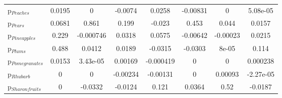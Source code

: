 \documentclass[11pt]{article}
\begin{document}
\begin{table}[h]
\begin{center}
\begin{tabular}{lccccccc}
p$_{Peaches}$ &0.0195 &0 &-0.0074 &0.0258 &-0.00831 &0 &5.08e-05 \\
p$_{Pears}$ &0.0681 &0.861 &0.199 &-0.023 &0.453 &0.044 &0.0157 \\
p$_{Pineapples}$ &0.229 &-0.000746 &0.0318 &0.0575 &-0.00642 &-0.00023 &0.0215 \\
p$_{Plums}$ &0.488 &0.0412 &0.0189 &-0.0315 &-0.0303 &8e-05 &0.114 \\
p$_{Pomegranates}$ &0.0153 &3.43e-05 &0.00169 &-0.000419 &0 &0 &0.000238 \\
p$_{Rhubarb}$ &0 &0 &-0.00234 &-0.00131 &0 &0.00093 &-2.27e-05 \\
p$_{Sharon fruits}$ &0 &-0.0332 &-0.0124 &0.121 &0.0364 &0.52 &-0.0187 \\
\end{tabular}
\end{center}
\end{table}
\end{document}
